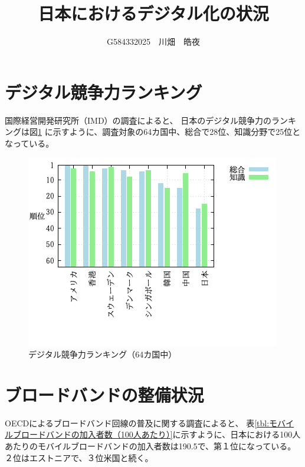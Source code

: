 \documentclass[a4paper,11pt,dvipdfmx]{ujarticle}
\title{日本におけるデジタル化の状況}
\author{G584332025　川畑　皓夜}
\begin{document}
\maketitle %
\section{デジタル競争力ランキング}
国際経営開発研究所（IMD）の調査\cite{IMD}によると、
日本のデジタル競争力のランキングは図\ref{fig:ランキング}
に示すように、調査対象の64カ国中、総合で28位、知識分野で25位となっている。




\begin{figure}[htbp]
    \centering
    \includegraphics[width=0.7\linewidth]{fig31.png}
    \caption{デジタル競争力ランキング（64カ国中）}\label{fig:ランキング}
 \end{figure}

\section{ブロードバンドの整備状況}
OECDによるブロードバンド回線の普及に関する調査\cite{OECD}によると、
表\ref{tbl:モバイルブロードバンドの加入者数（100人あたり）}に示すように、日本における100人あたりのモバイルブロードバンドの加入者数は190.5で、第１位になっている。２位はエストニアで、３位米国と続く。

\end{document}
